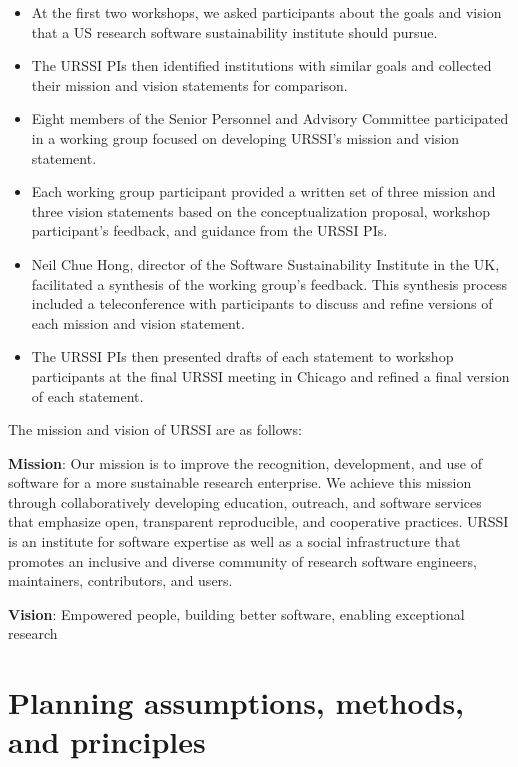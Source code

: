 \documentclass[
]{book}
\begin{document}
\begin{itemize}
\item
  At the first two workshops, we asked participants about the goals and vision
  that a US research software sustainability institute should pursue.
\item
  The URSSI PIs then identified institutions with similar goals and collected
  their mission and vision statements for comparison.
\item
  Eight members of the Senior Personnel and Advisory Committee participated in
  a working group focused on developing URSSI's mission and vision statement.
\item
  Each working group participant provided a written set of three mission and
  three vision statements based on the conceptualization proposal, workshop
  participant's feedback, and guidance from the URSSI PIs.
\item
  Neil Chue Hong, director of the Software Sustainability Institute in the UK,
  facilitated a synthesis of the working group's feedback. This synthesis process included a
  teleconference with participants to discuss and refine versions of each
  mission and vision statement.
\item
  The URSSI PIs then presented drafts of each statement to workshop participants
  at the final URSSI meeting in Chicago and refined a final version of each statement.
\end{itemize}

The mission and vision of URSSI are as follows:

\textbf{Mission}: Our mission is to improve the recognition, development, and use of
software for a more sustainable research enterprise. We achieve this mission
through collaboratively developing education, outreach, and software services
that emphasize open, transparent reproducible, and cooperative practices. URSSI
is an institute for software expertise as well as a social infrastructure that
promotes an inclusive and diverse community of research software engineers,
maintainers, contributors, and users.

\textbf{Vision}: Empowered people, building better software, enabling exceptional research

\hypertarget{planning-assumptions-methods-and-principles}{%
\section{Planning assumptions, methods, and principles}\label{planning-assumptions-methods-and-principles}}
\end{document}
